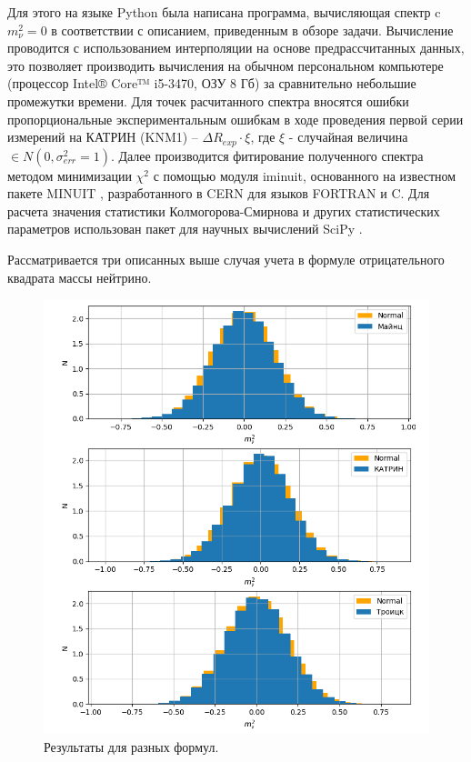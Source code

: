 \documentclass[a4paper,14pt]{extarticle}
\begin{document}
    Для этого на языке Python была написана программа, вычисляющая спектр c $m^2_\nu=0$ 
    в соответствии с описанием, приведенным в обзоре задачи. Вычисление проводится с 
    использованием интерполяции на основе предрассчитанных данных, это позволяет
    производить вычисления на обычном персональном компьютере (процессор Intel® Core™ i5-3470, ОЗУ 8 Гб)
    за сравнительно небольшие промежутки времени. Для точек расчитанного
    спектра вносятся ошибки пропорциональные экспериментальным ошибкам в ходе проведения 
    первой серии измерений на КАТРИН (KNM1) -- $\Delta R_{exp} \cdot \xi$, где $\xi$ -
    случайная величина $\in N(0, \sigma^2_{err} = 1)$. Далее производится фитирование полученного
    спектра методом минимизации $\chi^2$ с помощью модуля iminuit, основанного на известном
    пакете MINUIT \cite{MINUIT}, разработанного в CERN для языков FORTRAN и C. Для расчета 
    значения статистики Колмогорова-Смирнова и других статистических параметров использован
    пакет для научных вычислений SciPy \cite{scipy}. 
    
    Рассматривается три описанных выше случая учета в формуле отрицательного квадрата массы нейтрино.
    
    
    \begin{figure}
        \center
        \includegraphics[width=1\textwidth]{hists2}
        \captionsetup{width=0.8\textwidth}
        \caption{Результаты для разных формул.}
        \label{fig:hists}
    \end{figure}
    
\end{document}
